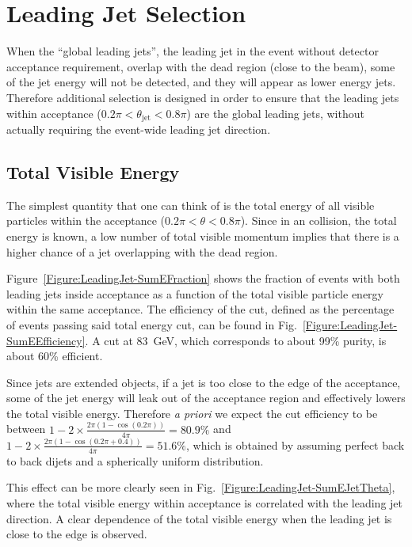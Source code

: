\section{Leading Jet Selection}\label{Section:LeadingJet}

When the ``global leading jets'', the leading jet in the event without detector acceptance requirement, overlap with the dead region (close to the beam), some of the jet energy will not be detected, and they will appear as lower energy jets.  Therefore additional selection is designed in order to ensure that the leading jets within acceptance ($0.2\pi < \theta_\text{jet} < 0.8\pi$) are the global leading jets, without actually requiring the event-wide leading jet direction.


\subsection{Total Visible Energy}

The simplest quantity that one can think of is the total energy of all visible particles within the acceptance ($0.2\pi < \theta < 0.8\pi$).  Since in an \ee collision, the total energy is known, a low number of total visible momentum implies that there is a higher chance of a jet overlapping with the dead region.

Figure~\ref{Figure:LeadingJet-SumEFraction} shows the fraction of events with both leading jets inside acceptance as a function of the total visible particle energy within the same acceptance.  The efficiency of the cut, defined as the percentage of events passing said total energy cut, can be found in Fig.~\ref{Figure:LeadingJet-SumEEfficiency}.  A cut at 83~GeV, which corresponds to about 99\% purity, is about 60\% efficient.  

Since jets are extended objects, if a jet is too close to the edge of the acceptance, some of the jet energy will leak out of the acceptance region and effectively lowers the total visible energy.  Therefore \textit{a priori} we expect the cut efficiency to be between $1-2\times \frac{2\pi(1-\cos(0.2\pi))}{4\pi} = 80.9\%$ and $1-2\times\frac{2\pi(1-\cos(0.2\pi+0.4))}{4\pi} = 51.6\%$, which is obtained by assuming perfect back to back dijets and a spherically uniform distribution.

This effect can be more clearly seen in Fig.~\ref{Figure:LeadingJet-SumEJetTheta}, where the total visible energy within acceptance is correlated with the leading jet direction.  A clear dependence of the total visible energy when the leading jet is close to the edge is observed.

